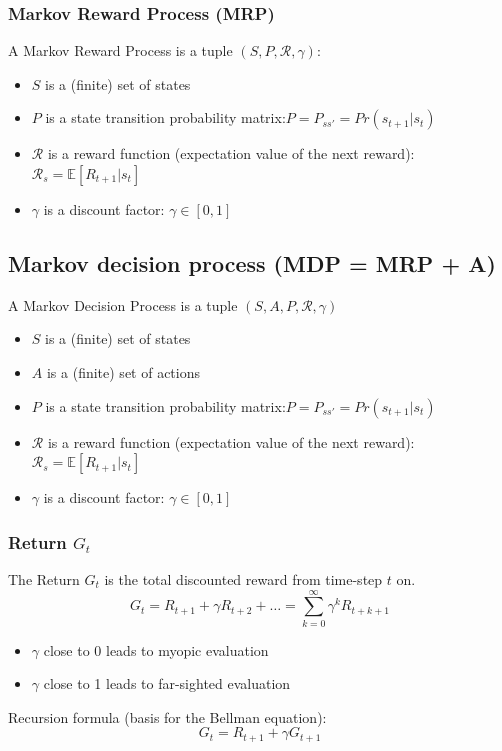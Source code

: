 \subsubsection{Markov Reward Process (MRP)}
A Markov Reward Process is a tuple \((S,P,\mathcal{R},\gamma)\):
\begin{itemize}
    \item \(S\) is a (finite) set of states
    \item \(P\) is a state transition probability matrix:\(P = P_{ss'} = Pr(s_{t+1}|s_t)\)
    \item \(\mathcal{R}\) is a reward function (expectation value of the next reward): \(\mathcal{R}_s = \mathbb{E}\left[R_{t+1}|s_t\right]\)
    \item \(\gamma\) is a discount factor: \(\gamma \in \left[0,1\right]\)
\end{itemize}
\subsection{Markov decision process (MDP = MRP + A)}
A Markov Decision Process is a tuple \((S,A,P,\mathcal{R},\gamma)\)
\begin{itemize}
    \item \(S\) is a (finite) set of states
    \item \(A\) is a (finite) set of actions
    \item \(P\) is a state transition probability matrix:\(P = P_{ss'} = Pr(s_{t+1}|s_t)\)
    \item \(\mathcal{R}\) is a reward function (expectation value of the next reward): \(\mathcal{R}_s = \mathbb{E}\left[R_{t+1}|s_t\right]\)
    \item \(\gamma\) is a discount factor: \(\gamma \in \left[0,1\right]\)
\end{itemize}

\subsubsection{Return \(G_t\)}
The Return \(G_t\) is the total discounted reward from time-step \(t\) on.
\[
G_t = R_{t+1} + \gamma R_{t+2} + \dots = \sum_{k = 0}^{\infty} \gamma^k R_{t+k+1}
\]
\begin{itemize}
    \item \(\gamma\) close to 0 leads to myopic evaluation
    \item \(\gamma\) close to 1 leads to far-sighted evaluation
\end{itemize}
Recursion formula (basis for the Bellman equation):
\[
G_t = R_{t+1} + \gamma G_{t+1}
\]
